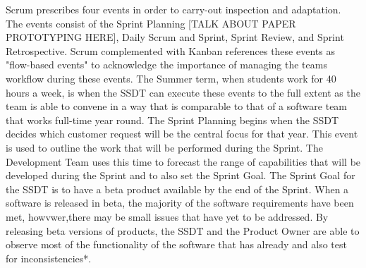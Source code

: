 Scrum prescribes four events in order to carry-out inspection and adaptation. The events consist of the Sprint Planning [TALK ABOUT PAPER PROTOTYPING HERE], Daily Scrum and Sprint, Sprint Review, and Sprint Retrospective. Scrum complemented with Kanban references these events as "flow-based events" to acknowledge the importance of managing the teams workflow during these events. The Summer term, when students work for 40 hours a week, is when the SSDT can execute these events to the full extent as the team is able to convene in a way that is comparable to that of a software team that works full-time year round. The Sprint Planning begins when the SSDT decides which customer request will be the central focus for that year. This event is used to outline the work that will be performed during the Sprint. The Development Team uses this time to forecast the range of capabilities that will be developed during the Sprint and to also set the Sprint Goal. The Sprint Goal for the SSDT is to have a beta product available by the end of the Sprint.  When a software is released in beta, the majority of the software requirements have been met, howvwer,there may be small issues that have yet to be addressed.  By releasing beta versions of products, the SSDT and the Product Owner are able to observe most of the functionality of the software that has already and also test for inconsistencies*.

